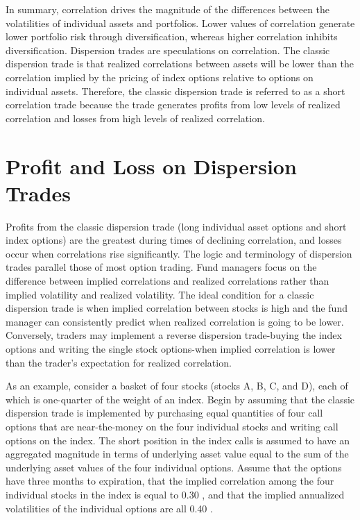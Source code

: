 \documentclass[11pt]{article}
\begin{document}
In summary, correlation drives the magnitude of the differences between the volatilities of individual assets and portfolios. Lower values of correlation generate lower portfolio risk through diversification, whereas higher correlation inhibits diversification. Dispersion trades are speculations on correlation. The classic dispersion trade is that realized correlations between assets will be lower than the correlation implied by the pricing of index options relative to options on individual assets. Therefore, the classic dispersion trade is referred to as a short correlation trade because the trade generates profits from low levels of realized correlation and losses from high levels of realized correlation.

\section*{Profit and Loss on Dispersion Trades}
Profits from the classic dispersion trade (long individual asset options and short index options) are the greatest during times of declining correlation, and losses occur when correlations rise significantly. The logic and terminology of dispersion trades parallel those of most option trading. Fund managers focus on the difference between implied correlations and realized correlations rather than implied volatility and realized volatility. The ideal condition for a classic dispersion trade is when implied correlation between stocks is high and the fund manager can consistently predict when realized correlation is going to be lower. Conversely, traders may implement a reverse dispersion trade-buying the index options and writing the single stock options-when implied correlation is lower than the trader's expectation for realized correlation.

As an example, consider a basket of four stocks (stocks A, B, C, and D), each of which is one-quarter of the weight of an index. Begin by assuming that the classic dispersion trade is implemented by purchasing equal quantities of four call options that are near-the-money on the four individual stocks and writing call options on the index. The short position in the index calls is assumed to have an aggregated magnitude in terms of underlying asset value equal to the sum of the underlying asset values of the four individual options. Assume that the options have three months to expiration, that the implied correlation among the four individual stocks in the index is equal to 0.30 , and that the implied annualized volatilities of the individual options are all 0.40 .
\end{document}
